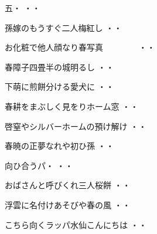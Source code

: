 \begin{shiika}五・
\hfill{・・}\end{shiika}

\begin{shiika}孫嫁のもうすぐ二人梅紅し
\hfill{・・}\end{shiika}

\begin{shiika}お化粧で他人顔なり春写真　　　　
\hfill{・・}\end{shiika}

\begin{shiika}春障子四畳半の城明るし
\hfill{・・}\end{shiika}

\begin{shiika}下萌に煎餅分ける愛犬に
\hfill{・・}\end{shiika}

\begin{shiika}春耕をまぶしく見をりホーム窓
\hfill{・・}\end{shiika}

\begin{shiika}啓窒やシルバーホームの預け解け
\hfill{・・}\end{shiika}

\begin{shiika}春暁の正夢なれや初ひ孫
\hfill{・・}\end{shiika}

\begin{shiika}向ひ合うパ・
\hfill{・・}\end{shiika}

\begin{shiika}おばさんと呼びくれ三人桜餅
\hfill{・・}\end{shiika}

\begin{shiika}浮雲に名付けあそびや春の風
\hfill{・・}\end{shiika}

\begin{shiika}こちら向くラッパ水仙こんにちは
\hfill{・・}\end{shiika}

